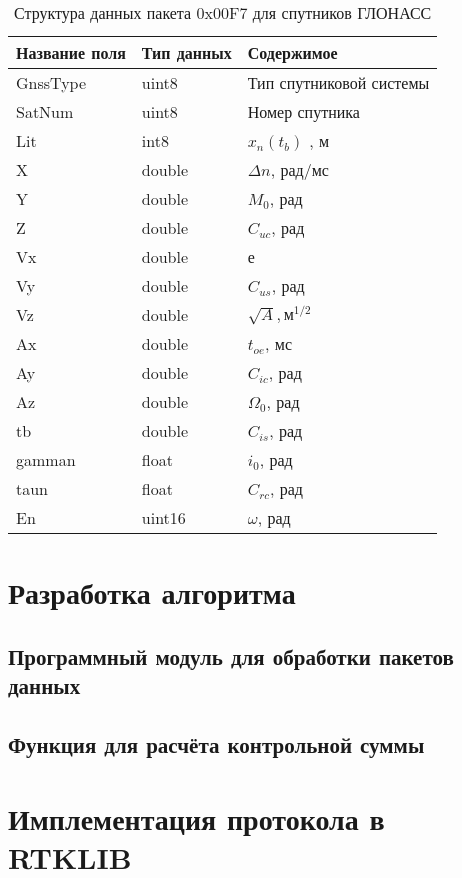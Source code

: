 \begin{longtable}[c]{|lll|}
	\caption{Структура данных пакета 0x00F7 для спутников ГЛОНАСС} \label{tab:formatf7glo}\\
	\hline
	Название поля & Тип данных & Содержимое \\
	\hline
	GnssType & uint8 & Тип спутниковой системы \\
	SatNum & uint8 & Номер спутника \\
	Lit & int8 & $x_{n}(t_b)$ , м \\
	X & double & $\Delta n$, рад/мс \\
	Y & double &  $M_0$, рад \\
	Z & double & $C_{uc}$, рад\\
	Vx & double & е \\
	Vy & double & $C_{us}$, рад \\
	Vz & double & $\sqrt{A}, м^{1/2}$ \\
	Ax & double & $t_{oe}$, мс \\
	Ay & double & $C_{ic}$, рад \\
	Az & double & $\Omega_{0}$, рад \\
	tb & double & $C_{is}$, рад \\
	gamman & float & $i_{0}$, рад \\
	taun & float & $C_{rc}$, рад \\
	En & uint16 & $\omega$, рад \\
	\hline	
\end{longtable}

\chapter{Разработка алгоритма}
\section{Программный модуль для обработки пакетов данных}
\label{cha:appendix1}


\newpage
\section{Функция для расчёта контрольной суммы}
\label{cha:appendix2}



\chapter{Имплементация протокола в RTKLIB}

